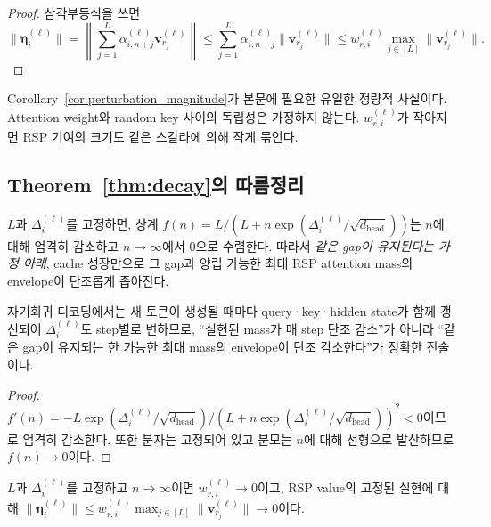 \begin{proof}
삼각부등식을 쓰면
\[
\|\boldsymbol{\eta}_i^{(\ell)}\|
=
\left\|\sum_{j=1}^{L}\alpha_{i,n+j}^{(\ell)}\mathbf{v}_{r_j}^{(\ell)}\right\|
\le
\sum_{j=1}^{L}\alpha_{i,n+j}^{(\ell)}\|\mathbf{v}_{r_j}^{(\ell)}\|
\le
w_{r,i}^{(\ell)}\max_{j\in[L]}\|\mathbf{v}_{r_j}^{(\ell)}\|.
\]
\end{proof}

Corollary~\ref{cor:perturbation_magnitude}가 본문에 필요한 유일한 정량적 사실이다. Attention weight와 random key 사이의 독립성은 가정하지 않는다. $w_{r,i}^{(\ell)}$가 작아지면 RSP 기여의 크기도 같은 스칼라에 의해 작게 묶인다.

\subsection{Theorem~\ref{thm:decay}의 따름정리}

\begin{corollary}\label{cor:sequence_annealing}
$L$과 $\Delta_i^{(\ell)}$를 고정하면, 상계 $f(n) = L/(L + n\exp(\Delta_i^{(\ell)}/\sqrt{d_{\text{head}}}))$는 $n$에 대해 엄격히 감소하고 $n\to\infty$에서 0으로 수렴한다. 따라서 \emph{같은 gap이 유지된다는 가정 아래}, cache 성장만으로 그 gap과 양립 가능한 최대 RSP attention mass의 envelope이 단조롭게 좁아진다.
\end{corollary}

\noindent 자기회귀 디코딩에서는 새 토큰이 생성될 때마다 query·key·hidden state가 함께 갱신되어 $\Delta_i^{(\ell)}$도 step별로 변하므로, ``실현된 mass가 매 step 단조 감소''가 아니라 ``같은 gap이 유지되는 한 가능한 최대 mass의 envelope이 단조 감소한다''가 정확한 진술이다.

\begin{proof}
$f'(n) = -L\exp(\Delta_i^{(\ell)}/\sqrt{d_{\text{head}}})/(L + n\exp(\Delta_i^{(\ell)}/\sqrt{d_{\text{head}}}))^2 < 0$이므로 엄격히 감소한다. 또한 분자는 고정되어 있고 분모는 $n$에 대해 선형으로 발산하므로 $f(n)\to0$이다.
\end{proof}

\begin{corollary}\label{cor:vanishing_perturbation}
$L$과 $\Delta_i^{(\ell)}$를 고정하고 $n\to\infty$이면 $w_{r,i}^{(\ell)} \to 0$이고, RSP value의 고정된 실현에 대해 $\|\boldsymbol{\eta}_i^{(\ell)}\| \le w_{r,i}^{(\ell)}\max_{j\in[L]}\|\mathbf{v}_{r_j}^{(\ell)}\| \to 0$이다.
\end{corollary}

